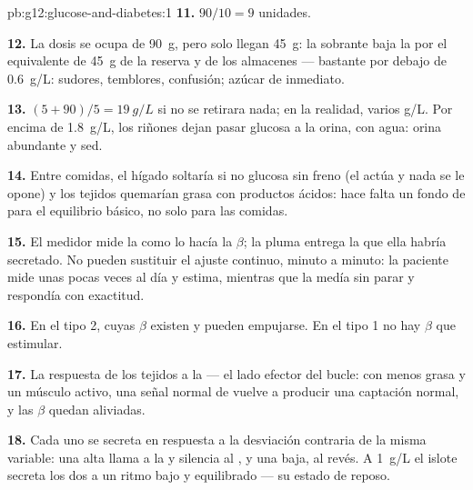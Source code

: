 \begin{solution}{pb:g12:glucose-and-diabetes:1}
\textbf{11.} $90/10 = 9$ unidades.

\textbf{12.} La dosis se ocupa de \qty{90}{g}, pero solo llegan
\qty{45}{g}: la  sobrante baja la  por el equivalente
de \qty{45}{g} de la reserva y de los almacenes --- bastante por debajo
de \qty{0.6}{g/L}: sudores, temblores, confusión; azúcar de inmediato.

\textbf{13.} $(5 + 90)/5 = \qty{19}{g/L}$ si no se retirara nada; en la
realidad, varios \unit{g/L}. Por encima de \qty{1.8}{g/L}, los riñones
dejan pasar glucosa a la orina, con agua: orina abundante y sed.

\textbf{14.} Entre comidas, el hígado soltaría si no glucosa sin freno
(el  actúa y nada se le opone) y los tejidos quemarían grasa
con productos ácidos: hace falta un fondo de  para el
equilibrio básico, no solo para las comidas.

\textbf{15.} El medidor mide la  como lo hacía la 
$\beta$; la pluma entrega la  que ella habría secretado. No
pueden sustituir el ajuste continuo, minuto a minuto: la paciente mide
unas pocas veces al día y estima, mientras que la  medía sin
parar y respondía con exactitud.

\textbf{16.} En el tipo 2, cuyas  $\beta$ existen y pueden
empujarse. En el tipo 1 no hay  $\beta$ que estimular.

\textbf{17.} La respuesta de los tejidos a la  --- el lado
efector del bucle: con menos grasa y un músculo activo, una señal
normal de  vuelve a producir una captación normal, y las
 $\beta$ quedan aliviadas.

\textbf{18.} Cada uno se secreta en respuesta a la desviación contraria
de la misma variable: una  alta llama a la  y silencia
al , y una baja, al revés. A \qty{1}{g/L} el islote secreta los
dos a un ritmo bajo y equilibrado --- su estado de reposo.


\end{solution}
